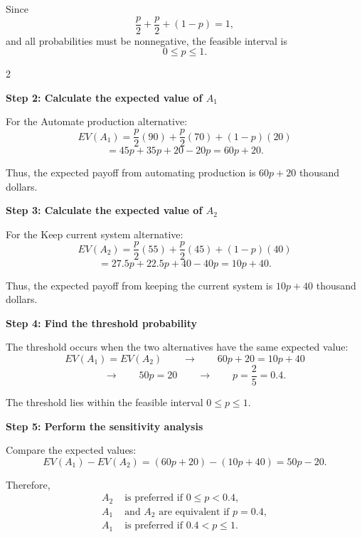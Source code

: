 	Since
	\[
	\frac{p}{2}+\frac{p}{2}+(1-p)=1,
	\]
	and all probabilities must be nonnegative, the feasible interval is
	\[
	0\leq p\leq1.
	\]
	
	\vspace{-3mm}
	
	\noindent
	\setlength{\columnseprule}{0.4pt}
	\begin{multicols}{2}
		\vspace{0pt}
		
		\textbf{Step 2: Calculate the expected value of $A_1$}
		
		For the Automate production alternative:
		\[
		EV(A_1)
		=
		\frac{p}{2}(90)
		+
		\frac{p}{2}(70)
		+
		(1-p)(20)
		\]
		\[
		=
		45p+35p+20-20p
		=
		60p+20.
		\]
		
		Thus, the expected payoff from automating production is
		$60p+20$ thousand dollars.
		
		\columnbreak
		
		\textbf{Step 3: Calculate the expected value of $A_2$}
		
		For the Keep current system alternative:
		\[
		EV(A_2)
		=
		\frac{p}{2}(55)
		+
		\frac{p}{2}(45)
		+
		(1-p)(40)
		\]
		\[
		=
		27.5p+22.5p+40-40p
		=
		10p+40.
		\]
		
		Thus, the expected payoff from keeping the current system is
		$10p+40$ thousand dollars.
		
	\end{multicols}
	
	
	\setlength{\columnseprule}{0pt}
	
	\textbf{Step 4: Find the threshold probability}
	
	The threshold occurs when the two alternatives have the same expected value:
	\[
	EV(A_1)=EV(A_2)
	\qquad\longrightarrow\qquad
	60p+20=10p+40
	\]
	\[
	\qquad\longrightarrow\qquad
	50p=20
	\qquad\longrightarrow\qquad
	p=\frac{2}{5}=0.4.
	\]
	
	The threshold lies within the feasible interval $0\leq p\leq1$.
	
	\textbf{Step 5: Perform the sensitivity analysis}
	
	Compare the expected values:
	\[
	EV(A_1)-EV(A_2)
	=
	(60p+20)-(10p+40)
	=
	50p-20.
	\]
	
	Therefore,
	\[
	\boxed{
		\begin{aligned}
			A_2 &\text{ is preferred if } 0\leq p<0.4,\\
			A_1 &\text{ and }A_2\text{ are equivalent if }p=0.4,\\
			A_1 &\text{ is preferred if }0.4<p\leq1.
		\end{aligned}
	}
	\]
	
